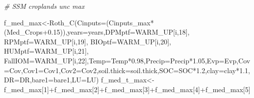 \documentclass[
  10pt,
  b5paper,
]{book}
\newenvironment{Shaded}{\begin{snugshade}}{\end{snugshade}}
\newcommand{\AttributeTok}[1]{\textcolor[rgb]{0.77,0.63,0.00}{#1}}
\newcommand{\CommentTok}[1]{\textcolor[rgb]{0.56,0.35,0.01}{\textit{#1}}}
\newcommand{\DecValTok}[1]{\textcolor[rgb]{0.00,0.00,0.81}{#1}}
\newcommand{\FloatTok}[1]{\textcolor[rgb]{0.00,0.00,0.81}{#1}}
\newcommand{\FunctionTok}[1]{\textcolor[rgb]{0.00,0.00,0.00}{#1}}
\newcommand{\NormalTok}[1]{#1}
\newcommand{\OtherTok}[1]{\textcolor[rgb]{0.56,0.35,0.01}{#1}}
\newcommand{\SpecialCharTok}[1]{\textcolor[rgb]{0.00,0.00,0.00}{#1}}
\begin{document}
\begin{Shaded}
\begin{Highlighting}[]
\CommentTok{\# SSM croplands unc max}

\NormalTok{f\_med\_max}\OtherTok{\textless{}{-}}\FunctionTok{Roth\_C}\NormalTok{(}\AttributeTok{Cinputs=}\NormalTok{(Cinputs\_max}\SpecialCharTok{*}\NormalTok{(Med\_Crops}\FloatTok{+0.15}\NormalTok{)),}\AttributeTok{years=}\NormalTok{years,}\AttributeTok{DPMptf=}\NormalTok{WARM\_UP[i,}\DecValTok{18}\NormalTok{], }\AttributeTok{RPMptf=}\NormalTok{WARM\_UP[i,}\DecValTok{19}\NormalTok{], }\AttributeTok{BIOptf=}\NormalTok{WARM\_UP[i,}\DecValTok{20}\NormalTok{], }\AttributeTok{HUMptf=}\NormalTok{WARM\_UP[i,}\DecValTok{21}\NormalTok{], }\AttributeTok{FallIOM=}\NormalTok{WARM\_UP[i,}\DecValTok{22}\NormalTok{],}\AttributeTok{Temp=}\NormalTok{Temp}\SpecialCharTok{*}\FloatTok{0.98}\NormalTok{,}\AttributeTok{Precip=}\NormalTok{Precip}\SpecialCharTok{*}\FloatTok{1.05}\NormalTok{,}\AttributeTok{Evp=}\NormalTok{Evp,}\AttributeTok{Cov=}\NormalTok{Cov,}\AttributeTok{Cov1=}\NormalTok{Cov1,}\AttributeTok{Cov2=}\NormalTok{Cov2,}\AttributeTok{soil.thick=}\NormalTok{soil.thick,}\AttributeTok{SOC=}\NormalTok{SOC}\SpecialCharTok{*}\FloatTok{1.2}\NormalTok{,}\AttributeTok{clay=}\NormalTok{clay}\SpecialCharTok{*}\FloatTok{1.1}\NormalTok{,}\AttributeTok{DR=}\NormalTok{DR,}\AttributeTok{bare1=}\NormalTok{bare1,}\AttributeTok{LU=}\NormalTok{LU)}
\NormalTok{f\_med\_t\_max}\OtherTok{\textless{}{-}}\NormalTok{f\_med\_max[}\DecValTok{1}\NormalTok{]}\SpecialCharTok{+}\NormalTok{f\_med\_max[}\DecValTok{2}\NormalTok{]}\SpecialCharTok{+}\NormalTok{f\_med\_max[}\DecValTok{3}\NormalTok{]}\SpecialCharTok{+}\NormalTok{f\_med\_max[}\DecValTok{4}\NormalTok{]}\SpecialCharTok{+}\NormalTok{f\_med\_max[}\DecValTok{5}\NormalTok{]}


\end{Highlighting}
\end{Shaded}
\end{document}
